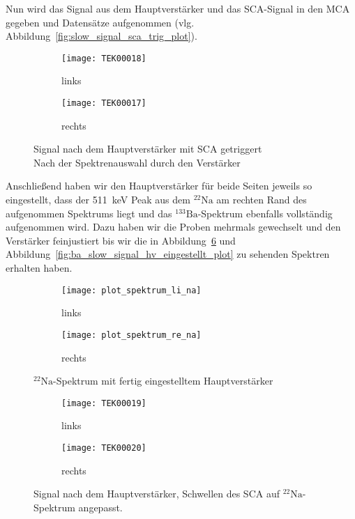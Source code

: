 \documentclass[11pt, ngerman, fleqn, DIV=15, headinclude, BCOR=2cm]{scrreprt}
\begin{document}
Nun wird das Signal aus dem Hauptverstärker und das SCA-Signal in den MCA
gegeben und Datensätze aufgenommen (vlg.
Abbildung~\ref{fig:slow_signal_sca_trig_plot}).
\begin{figure}[htbp]
	\centering
	\begin{subfigure}{0.49 \textwidth}
		\texttt{[image: TEK00018]}
		\caption{%
			links
		}
		\label{fig:slow_signal_hv_eingestellt-li}
	\end{subfigure}
	\begin{subfigure}{0.49 \textwidth}
		\texttt{[image: TEK00017]}
		\caption{%
			rechts
		}
		\label{fig:slow_signal_hv_eingestellt-re}
	\end{subfigure}
	\caption{%
		Signal nach dem Hauptverstärker mit SCA getriggert\\
		Nach der Spektrenauswahl durch den Verstärker
	}
	\label{fig:slow_signal_hv_eingestellt}
\end{figure}
Anschließend haben wir den Hauptverstärker für beide Seiten jeweils so
eingestellt, dass der \SI{511}{\kilo\electronvolt} Peak aus dem
$^{22}\text{Na}$ am rechten Rand des aufgenommen Spektrums liegt und das
$^{133}\text{Ba}$-Spektrum ebenfalls vollständig aufgenommen wird. Dazu haben
wir die Proben mehrmals gewechselt und den Verstärker feinjustiert bis wir die
in Abbildung~\ref{fig:slow_signal_hv_eingestellt_plot} und
Abbildung~\ref{fig:ba_slow_signal_hv_eingestellt_plot} zu sehenden Spektren
erhalten haben.

\begin{figure}[htbp]
	\centering
	\begin{subfigure}{0.49 \textwidth}
		\texttt{[image: plot\_spektrum\_li\_na]}
		\caption{%
			links
		}
		\label{fig:slow_hv_eingestellt-li_plot}
	\end{subfigure}
	\begin{subfigure}{0.49 \textwidth}
		\texttt{[image: plot\_spektrum\_re\_na]}
		\caption{%
			rechts
		}
		\label{fig:slow_hv_eingestellt-re_plot}
	\end{subfigure}
	\caption{%
		$^{22}\text{Na}$-Spektrum mit fertig eingestelltem
		Hauptverstärker
	}
	\label{fig:slow_signal_hv_eingestellt_plot}
\end{figure}

\begin{figure}[htbp]
	\centering
	\begin{subfigure}{0.49 \textwidth}
		\texttt{[image: TEK00019]}
		\caption{%
			links
		}
		\label{fig:slow_signal_sca_eingestellt-li}
	\end{subfigure}
	\begin{subfigure}{0.49 \textwidth}
		\texttt{[image: TEK00020]}
		\caption{%
			rechts
		}
		\label{fig:slow_signal_sca_eingestellt-re}
	\end{subfigure}
	\caption{%
		Signal nach dem Hauptverstärker, Schwellen des SCA auf
		$^{22}\text{Na}$-Spektrum angepasst.
	}
	\label{fig:slow_signal_sca_eingestellt}
\end{figure}
\end{document}
